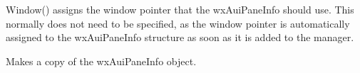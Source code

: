 \label{wxauipaneinfowindow}


Window() assigns the window pointer that the wxAuiPaneInfo should use.  This normally does not need to be specified, as the window pointer is automatically assigned to the wxAuiPaneInfo structure as soon as it is added to the manager.

\label{wxauipaneinfooperatorassign}


Makes a copy of the wxAuiPaneInfo object.

